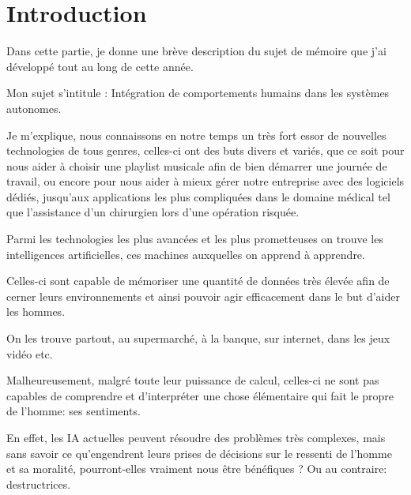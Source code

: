 
\chapter{Introduction} %

\label{Chapter1} %


\newcommand{\keyword}[1]{\textbf{#1}}
\newcommand{\tabhead}[1]{\textbf{#1}}
\newcommand{\code}[1]{\texttt{#1}}
\newcommand{\file}[1]{\texttt{\bfseries#1}}
\newcommand{\option}[1]{\texttt{\itshape#1}}

Dans cette partie, je donne une brève description du sujet de mémoire que j'ai développé tout au long de cette année.

Mon sujet s'intitule : Intégration de comportements humains dans les systèmes autonomes.

Je m'explique, nous connaissons en notre temps un très fort essor de nouvelles technologies de tous genres, celles-ci ont des buts divers et variés, que ce soit pour nous aider à choisir une playlist musicale afin de bien démarrer une journée de travail, ou encore pour nous aider à mieux gérer notre entreprise avec des logiciels dédiés,  jusqu'aux applications les plus compliquées dans le domaine médical tel que l'assistance d'un chirurgien lors d'une opération risquée.

Parmi les technologies les plus avancées et les plus prometteuses on trouve les intelligences artificielles, ces machines auxquelles on apprend à apprendre.

Celles-ci sont capable de mémoriser une quantité de données très élevée afin de cerner leurs environnements et ainsi pouvoir agir efficacement dans le but d'aider les hommes.

On les trouve partout, au supermarché, à la banque, sur internet, dans les jeux 
vidéo etc.

Malheureusement, malgré toute leur puissance de calcul, celles-ci ne sont pas capables de comprendre et d'interpréter une chose élémentaire qui fait le propre de l'homme: ses sentiments.

En effet, les IA actuelles peuvent résoudre des problèmes très complexes, mais sans savoir ce qu'engendrent leurs prises de décisions sur le ressenti de l'homme et sa moralité, pourront-elles vraiment nous être bénéfiques ? Ou au contraire: destructrices.


